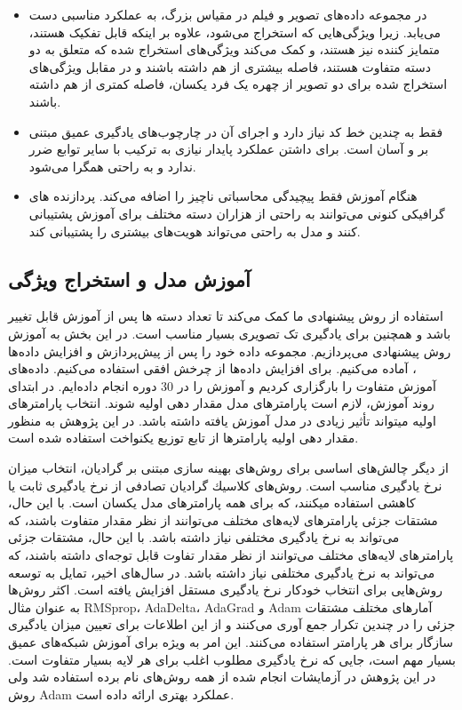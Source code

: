 \begin{itemize}
 \item
در مجموعه داده‌های تصویر و فیلم در مقیاس بزرگ‌، به عملکرد مناسبی دست می‌یابد. زیرا ویژگی‌هایی که استخراج ‌می‌شود، علاوه بر اینکه قابل تفکیک  هستند، متمایز کننده  نیز هستند، و کمک می‌کند ویژگی‌های استخراج شده که متعلق به دو دسته متفاوت هستند، فاصله بیشتری از هم داشته باشند و در مقابل ویژگی‌های استخراج شده برای دو تصویر از چهره یک فرد یکسان، فاصله کمتری از هم داشته باشند.
 \item
فقط به چندین خط کد نیاز دارد و اجرای آن در چارچوب‌های  یادگیری عمیق مبتنی بر  و  آسان است. برای داشتن عملکرد پایدار نیازی به ترکیب با سایر توابع ضرر ندارد و به راحتی همگرا می‌شود.
 \item
هنگام آموزش فقط پیچیدگی محاسباتی ناچیز را اضافه می‌کند. پردازنده های گرافیکی کنونی می‌توانند به راحتی از هزاران دسته مختلف برای آموزش پشتیبانی کنند و مدل به راحتی می‌تواند هویت‌های بیشتری را پشتیبانی کند.
\end{itemize} 

\subsection{آموزش مدل و استخراج ویژگی}
استفاده از روش پیشنهادی ما کمک می‌کند تا تعداد دسته ها پس از آموزش قابل تغییر باشد و همچنین برای یادگیری تک تصویری  بسیار مناسب است. در این بخش به آموزش روش پیشنهادی می‌پردازیم. مجموعه داده خود را پس از پیش‌پردازش و افزایش‌ داده‌ها ، آماده می‌کنیم. برای افزایش داده‌ها از چرخش افقی  استفاده می‌کنیم. داده‌های آموزش متفاوت را بارگزاری کردیم و آموزش را در 30 دوره  انجام داده‌ایم. در ابتدای روند آموزش، لازم است پارامترهای مدل مقدار دهی اولیه شوند. انتخاب پارامترهای اولیه میتواند تأثیر زیادی در مدل آموزش یافته داشته باشد. در این پژوهش به منظور مقدار دهی اولیه پارامترها از تابع توزیع یكنواخت استفاده شده است. 

\noindent
از دیگر چالش‌های اساسی برای روش‌های بهینه سازی مبتنی بر گرادیان، انتخاب میزان نرخ یادگیری مناسب است. روش‌های كلاسیك گرادیان تصادفی از نرخ یادگیری ثابت یا كاهشی استفاده میكنند، كه برای همه پارامترهای مدل یكسان است. با این حال، مشتقات جزئی پارامترهای لایه‌های مختلف می‌توانند از نظر مقدار متفاوت باشند، كه می‌تواند به نرخ یادگیری مختلفی نیاز داشته باشد. با این حال، مشتقات جزئی پارامترهای لایه‌های مختلف می‌توانند از نظر مقدار تفاوت قابل توجه‌ای داشته باشند، كه می‌تواند به نرخ یادگیری مختلفی نیاز داشته باشد. در سال‌های اخیر، تمایل به توسعه روش‌هایی برای انتخاب خودكار نرخ یادگیری مستقل افزایش یافته است. اكثر روش‌ها به عنوان مثال
RMSprop، 
AdaDelta، 
AdaGrad
و Adam آمارهای مختلف مشتقات جزئی را در چندین تكرار جمع آوری می‌كنند و از این اطلاعات برای تعیین میزان یادگیری سازگار برای هر پارامتر استفاده می‌كنند. این امر به ویژه برای آموزش شبكه‌های عمیق بسیار مهم است، جایی كه نرخ یادگیری مطلوب اغلب برای هر لایه بسیار متفاوت است. در این پژوهش در آزمایشات انجام شده از همه روش‌های نام برده استفاده شد ولی روش Adam عملكرد بهتری ارائه داده است.

